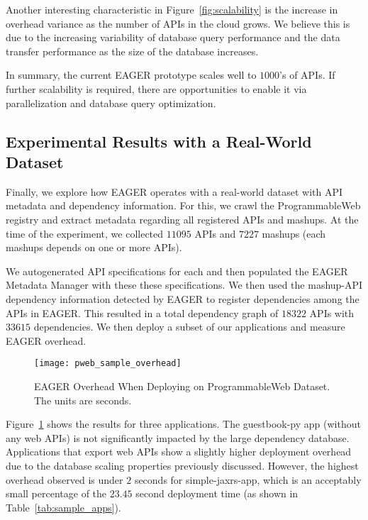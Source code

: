 Another interesting characteristic in Figure~\ref{fig:scalability} is the
increase in overhead variance as the number of APIs in the cloud
grows.  We believe this is due to the increasing variability of database query
performance and the data transfer performance as the size of the database
increases.

In summary, the current EAGER prototype scales well to $1000$'s of APIs.
If further scalability is required, there are opportunities to enable it
via parallelization and database query optimization.

\subsection{Experimental Results with a Real-World Dataset}

Finally, we explore how EAGER operates with a real-world dataset with API
metadata and dependency information. For this, we crawl the ProgrammableWeb
registry and extract metadata regarding all registered APIs and mashups.
At the time of the experiment, we collected $11095$ APIs and $7227$ 
mashups (each mashups depends on one or more APIs).

We autogenerated API specifications for each and then
populated the EAGER Metadata Manager with these these specifications.
We then used the
mashup-API dependency information detected by EAGER
to register dependencies among the APIs in 
EAGER. This resulted in a total dependency graph of $18322$ APIs 
with $33615$ dependencies.  We then deploy a subset of our applications
and measure EAGER overhead.

\begin{figure}
\centering
\texttt{[image: pweb\_sample\_overhead]}
\caption{EAGER Overhead When Deploying on ProgrammableWeb Dataset.  The units
are seconds.}
\label{fig:pweb_sample_overhead}
\end{figure}

Figure~\ref{fig:pweb_sample_overhead} shows the results for three applications. The guestbook-py app
(without any web APIs) is not significantly impacted by the large dependency database. 
Applications that export web APIs show a slightly higher deployment overhead
due to the database scaling properties previously discussed. 
However, the highest overhead observed is under $2$ seconds for
simple-jaxrs-app, which is an 
acceptably small percentage of the $23.45$ second deployment time (as shown in
Table~\ref{tab:sample_apps}).

